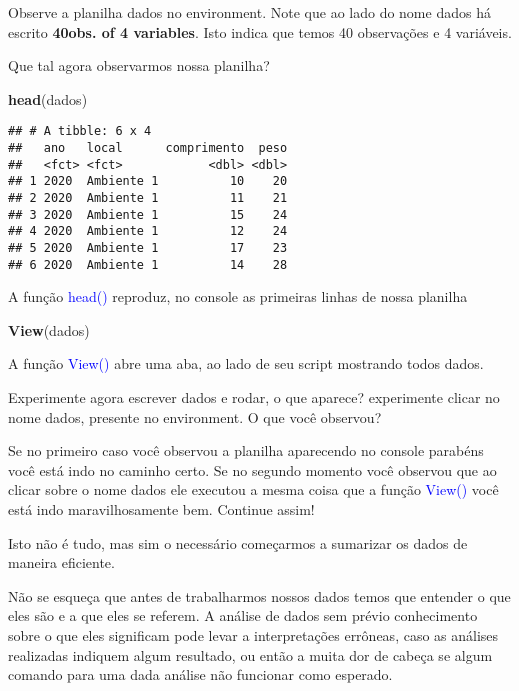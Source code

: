 \documentclass[titlepage, oneside, openany, a4paper]{book}
\newenvironment{Shaded}{\begin{snugshade}}{\end{snugshade}}
\newcommand{\KeywordTok}[1]{\textcolor[rgb]{0.13,0.29,0.53}{\textbf{#1}}}
\newcommand{\NormalTok}[1]{#1}
\begin{document}
Observe a planilha dados no environment. Note que ao lado do nome dados há escrito \textbf{40obs. of 4 variables}. Isto indica que temos 40 observações e 4 variáveis.

Que tal agora observarmos nossa planilha?

\begin{Shaded}
\begin{Highlighting}[]
\KeywordTok{head}\NormalTok{(dados)}
\end{Highlighting}
\end{Shaded}

\begin{verbatim}
## # A tibble: 6 x 4
##   ano   local      comprimento  peso
##   <fct> <fct>            <dbl> <dbl>
## 1 2020  Ambiente 1          10    20
## 2 2020  Ambiente 1          11    21
## 3 2020  Ambiente 1          15    24
## 4 2020  Ambiente 1          12    24
## 5 2020  Ambiente 1          17    23
## 6 2020  Ambiente 1          14    28
\end{verbatim}

A função \textcolor{blue}{head()} reproduz, no console as primeiras linhas de nossa planilha

\begin{Shaded}
\begin{Highlighting}[]
\KeywordTok{View}\NormalTok{(dados)}
\end{Highlighting}
\end{Shaded}

A função \textcolor{blue}{View()} abre uma aba, ao lado de seu script mostrando todos dados.

Experimente agora escrever dados e rodar, o que aparece? experimente clicar no nome dados, presente no environment. O que você observou?

Se no primeiro caso você observou a planilha aparecendo no console parabéns você está indo no caminho certo. Se no segundo momento você observou que ao clicar sobre o nome dados ele executou a mesma coisa que a função \textcolor{blue}{View()} você está indo maravilhosamente bem. Continue assim!

Isto não é tudo, mas sim o necessário começarmos a sumarizar os dados de maneira eficiente.

Não se esqueça que antes de trabalharmos nossos dados temos que entender o que eles são e a que eles se referem. A análise de dados sem prévio conhecimento sobre o que eles significam pode levar a interpretações errôneas, caso as análises realizadas indiquem algum resultado, ou então a muita dor de cabeça se algum comando para uma dada análise não funcionar como esperado.
\end{document}
